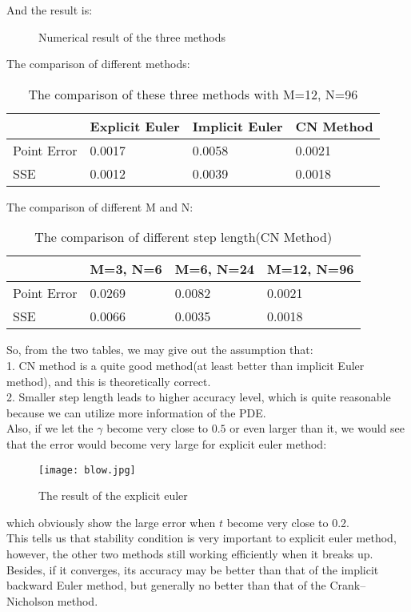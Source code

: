 \documentclass[a4paper]{article}
\begin{document}
And the result is:
\begin{figure}[H]
\centering
{}
\caption{Numerical result of the three methods}
\end{figure}
The comparison of different methods:
\begin{table}[!htbp]
\centering
\caption{The comparison of these three methods with M=12, N=96}
\begin{tabular}{|l|l|l|l|}
\hline
 & Explicit Euler & Implicit Euler & CN Method \\
\hline
 Point Error & 0.0017 & 0.0058 & 0.0021 \\
\hline
 SSE & 0.0012 & 0.0039 & 0.0018 \\
\hline
\end{tabular}
\end{table}
The comparison of different M and N:
\begin{table}[!htbp]
\centering
\caption{The comparison of different step length(CN Method)}
\begin{tabular}{|l|l|l|l|}
\hline
 & M=3, N=6 & M=6, N=24 & M=12, N=96 \\
\hline
 Point Error & 0.0269 & 0.0082 & 0.0021 \\
\hline
 SSE & 0.0066 & 0.0035 & 0.0018 \\
\hline
\end{tabular}
\end{table}
So, from the two tables, we may give out the assumption that:\\
1. CN method is a quite good method(at least better than implicit Euler method), and this is theoretically correct.\\
2. Smaller step length leads to higher accuracy level, which is quite reasonable because we can utilize more information of the PDE. \\
Also, if we let the $\gamma$ become very close to $0.5$ or even larger than it, we would see that the error would become very large for explicit euler method:
\begin{figure}[H]
\centering
\texttt{[image: blow.jpg]}
\caption{The result of the explicit euler}
\label{dis1_1}
\end{figure}
which obviously show the large error when $t$ become very close to 0.2.\\
This tells us that stability condition is very important to explicit euler method, however, the other two methods still working efficiently when it breaks up. Besides, if it converges, its accuracy may be better than that of the implicit backward Euler method, but generally no better than that of the Crank–Nicholson method.
\end{document}
